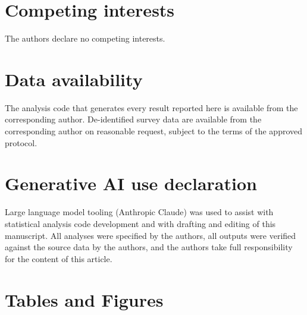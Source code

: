 \documentclass[12pt]{article}
\begin{document}
\section*{Competing interests}
The authors declare no competing interests.

\section*{Data availability}
The analysis code that generates every result reported here is available from the corresponding author.
De-identified survey data are available from the corresponding author on reasonable request, subject to the
terms of the approved protocol.

\section*{Generative AI use declaration}
Large language model tooling (Anthropic Claude) was used to assist with statistical analysis code
development and with drafting and editing of this manuscript. All analyses were specified by the authors,
all outputs were verified against the source data by the authors, and the authors take full responsibility
for the content of this article.



\clearpage

\section*{Tables and Figures}
\end{document}
